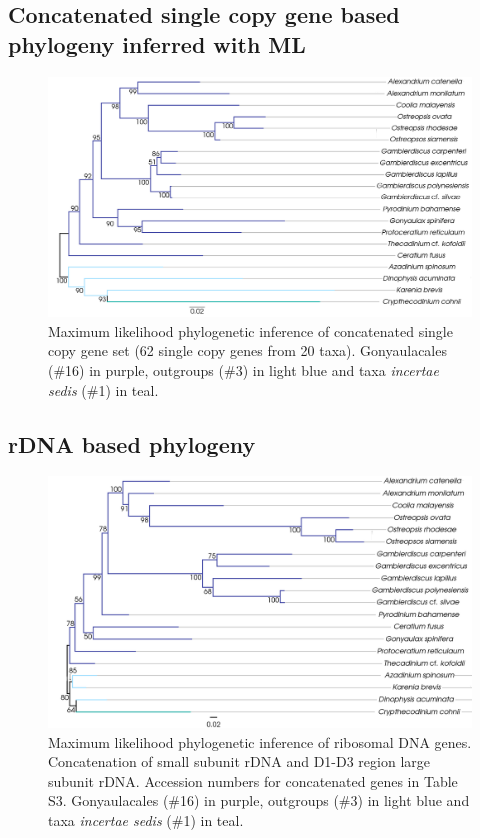 \documentclass[12pt]{article}
\begin{document}
\subsection*{Concatenated single copy gene based phylogeny inferred with ML}
\FloatBarrier 
\begin{figure} 
\includegraphics[scale=.23]{figures/Singlecopy-concat-ML.png} 
\caption{Maximum likelihood phylogenetic inference of concatenated single copy gene set (62 single copy genes from 20 taxa). Gonyaulacales (\#16) in purple, outgroups (\#3) in light blue and taxa \textit{incertae sedis} (\#1) in teal.} 
\label{fig:SCconcatML}
\end{figure} 
\FloatBarrier

\subsection*{rDNA based phylogeny}
\FloatBarrier 
\begin{figure} 
\includegraphics[scale=.23]{figures/rDNA-ML.png} 
\caption{Maximum likelihood phylogenetic inference of ribosomal DNA genes. Concatenation of small subunit rDNA and D1-D3 region large subunit rDNA. Accession numbers for concatenated genes in Table S3. Gonyaulacales (\#16) in purple, outgroups (\#3) in light blue and taxa \textit{incertae sedis} (\#1) in teal.} 
\label{fig:rdna}
\end{figure} 
\FloatBarrier
\end{document}
